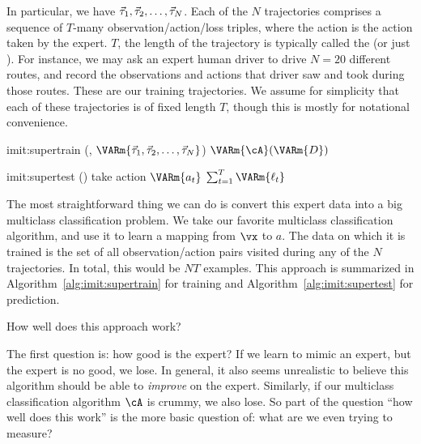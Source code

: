 In particular, we have $\vec\tau_1, \vec\tau_2, \dots, \vec\tau_N$.
Each of the $N$ trajectories comprises a sequence of $T$-many observation/action/loss triples, where the action is the action taken by the expert.
$T$, the length of the trajectory is typically called the  (or just ).
For instance, we may ask an expert human driver to drive $N=20$ different routes, and record the observations and actions that driver saw and took during those routes.
These are our training trajectories.
We assume for simplicity that each of these trajectories is of fixed length $T$, though this is mostly for notational convenience.

\newalgorithm%
  {imit:supertrain}%
  {(\VARm{\cA}, $\VARm{\vt_1, \vt_2, \dots, \vt_N}$)}
  {
    \RETURN $\VARm{\cA}(\VARm{D})$
  }

\newalgorithm%
  {imit:supertest}%
  {()}
  {
      \STATE take action $\VARm{a_t}$
    \ENDFOR
    \RETURN $\sum_{t=1}^T \VARm{\ell_t}$
  }


The most straightforward thing we can do is convert this expert data into a big multiclass classification problem.
We take our favorite multiclass classification algorithm, and use it to learn a mapping from $\vx$ to $a$.
The data on which it is trained is the set of all observation/action pairs visited during any of the $N$ trajectories.
In total, this would be $NT$ examples.
This approach is summarized in Algorithm~\ref{alg:imit:supertrain} for training and Algorithm~\ref{alg:imit:supertest} for prediction.

How well does this approach work?

The first question is: how good is the expert?
If we learn to mimic an expert, but the expert is no good, we lose.
In general, it also seems unrealistic to believe this algorithm should be able to \emph{improve} on the expert.
Similarly, if our multiclass classification algorithm $\cA$ is crummy, we also lose.
So part of the question ``how well does this work'' is the more basic question of: what are we even trying to measure?

